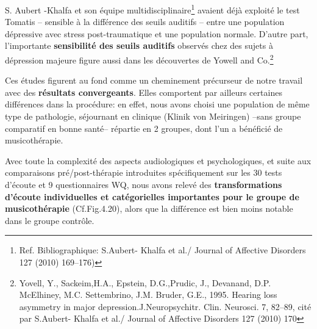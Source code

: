 S. Aubert -Khalfa et son équipe multidisciplinaire\footnote{ \autocite{affectiveDisorders} Ref. Bibliographique: S.Aubert- Khalfa
et al./ Journal of Affective Disorders 127 (2010) 169--176)} avaient déjà
exploité le test Tomatis -- sensible à la différence des
seuils auditifs -- entre une population
dépressive avec stress post-traumatique et une population normale.
D'autre part, l'importante\textbf{ sensibilité des seuils auditifs }observés chez des
sujets à dépression majeure figure aussi dans les découvertes de Yowell and Co.\footnote{Yovell, Y.,
  Sackeim,H.A., Epstein, D.G.,Prudic, J., Devanand, D.P. McElhiney,
  M.C. Settembrino, J.M. Bruder, G.E., 1995. Hearing loss asymmetry in
  major depression.J.Neuropsychitr. Clin. Neurosci. 7, 82--89, cité
  par S.Aubert- Khalfa et al./ Journal of Affective Disorders 127
  (2010) 170  }

Ces études figurent au fond comme un cheminement précurseur de notre
travail avec des \textbf{résultats convergeants}. Elles comportent par ailleurs certaines différences dans la
 procédure:  %
 en effet, nous avons choisi 
 une population de même type de pathologie, séjournant en clinique (Klinik von Meiringen) --sans
 groupe comparatif en bonne santé-- répartie en 2 groupes,
dont l'un a bénéficié de
musicothérapie.


Avec toute la
complexité des aspects audiologiques et psychologiques, 
et suite aux comparaisons 
pré/post-thérapie introduites spécifiquement sur les 30 tests d'écoute et 9 questionnaires WQ, nous
avons relevé des \textbf{transformations d'écoute 
 individuelles et
catégorielles importantes pour le groupe de musicothérapie} (Cf.Fig.4.20),  alors que
la différence est bien moins notable dans le groupe contrôle.







